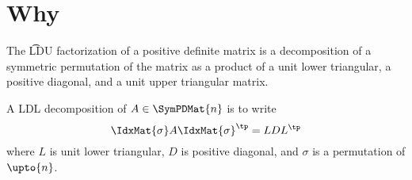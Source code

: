 
\section{Why}

The \t{LDU factorization} of a positive definite matrix is a decomposition of a symmetric permutation of the matrix as a product of a unit lower triangular, a positive diagonal, and a unit upper triangular matrix.


A LDL decomposition of $A \in \SymPDMat{n}$ is to write
$$
  \IdxMat{\sigma}A\IdxMat{\sigma}^{\tp}
  =
  LDL^{\tp}
$$
where $L$ is unit lower triangular, $D$ is positive diagonal, and $\sigma$ is a permutation of $\upto{n}$.
